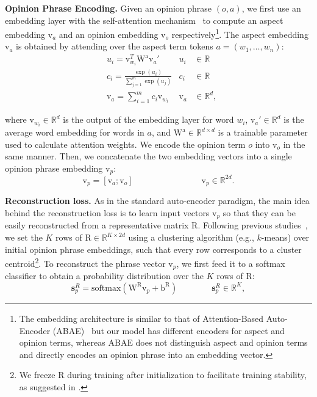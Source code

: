 \smallskip
\noindent \textbf{Opinion Phrase Encoding.} Given an opinion phrase $(o, a)$, 
we first use an embedding layer with the self-attention mechanism~\cite{he2017unsupervised} to compute an aspect embedding $\mathrm{v}_a$ and an opinion embedding $\mathrm{v}_o$ respectively\footnote{The embedding architecture is similar to that of Attention-Based Auto-Encoder (ABAE)~\cite{he2017unsupervised} but our model has different encoders for aspect and opinion terms, whereas ABAE does not distinguish aspect and opinion terms and directly encodes an opinion phrase into an embedding vector.}.
The aspect embedding $\mathrm{v}_a$ is obtained by attending over the aspect term tokens $a = (w_1, \dots, w_n)$:
\begin{align}
    &u_i = \mathrm{v}_{w_i}^T \mathrm{W}^{\mathrm{a}}  \mathrm{v}_{a}' & u_i &\in \mathbb{R} \\
    &c_{i} = \frac{\exp(u_i)}{\sum_{j=1}^{m} \exp(u_j)} & c_i& \in \mathbb{R} \\ 
    &\mathrm{v}_a = \sum_{i=1}^{m} c_i \mathrm{v}_{w_i} & \mathrm{v}_a&\in \mathbb{R}^{d},
\end{align}

\noindent
where $\mathrm{v}_{w_i} \in \mathbb{R}^d$ is the output of the embedding layer for word $w_i$, $\mathrm{v}_{a}' \in \mathbb{R}^d$ is the average word embedding for words in $a$, and $\mathrm{W}^{\mathrm{a}} \in \mathbb{R}^{d\times d}$ is a trainable parameter used to calculate attention weights.
We encode the opinion term $o$ into $\mathrm{v}_o$ in the same manner.
Then, we concatenate the two embedding vectors into a single opinion phrase embedding $\mathrm{v}_{p}$:
\begin{equation}
    \mathrm{v}_{p} = [\mathrm{v}_a; \mathrm{v}_o] \qquad\qquad\qquad\qquad \mathrm{v}_{p}\in \mathbb{R}^{2d}.
\end{equation}

\smallskip
\noindent \textbf{Reconstruction loss.} As in the standard auto-encoder paradigm, the main idea behind the reconstruction loss is to learn input vectors $\mathrm{v}_p$ so that they can be easily reconstructed from a representative matrix $\mathrm{R}$. Following previous studies~\cite{he2017unsupervised,angelidis2018summarizing}, we set the $K$ rows of $\mathrm{R} \in \mathbb{R}^{K\times 2d}$ using a clustering algorithm (e.g., $k$-means) over initial opinion phrase embeddings, such that every row corresponds to a cluster centroid\footnote{We freeze $\mathrm{R}$ during training after initialization to facilitate training stability, as suggested in \cite{angelidis2018summarizing}.}.
To reconstruct the phrase vector $\mathrm{v}_{p}$, we first feed it to a softmax classifier to obtain a  probability distribution over the $K$ rows of $\mathrm{R}$:
\begin{equation}\label{eq:assignment_dist}
    \mathbf{s}^R_p = \text{softmax}(\mathrm{W}^{\mathrm{R}}  \mathrm{v}_{p} + \mathrm{b}^{\mathrm{R}})\qquad\qquad \mathbf{s}^R_p \in \mathbb{R}^{K},
\end{equation}

